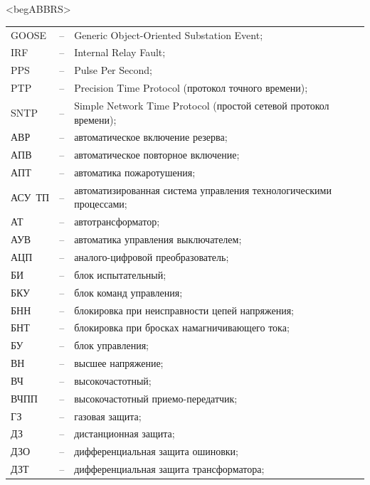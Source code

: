 \color{unimain}\section*{}
{\color{white}\fontsize{0.1pt}{0.1pt}\selectfont<begABBRS>}
\color{black}
\begin{longtable}{>{\raggedright\arraybackslash}m{2cm}>{\raggedright\arraybackslash}m{0.5cm}>{\raggedright\arraybackslash}m{20cm}}
\endfirsthead\endhead\endfoot\endlastfoot
GOOSE & -- & Generic Object-Oriented Substation Event; \\
IRF & -- & Internal Relay Fault; \\
PPS & -- & Pulse Per Second; \\
PTP & -- & Precision Time Protocol (протокол точного времени); \\
SNTP & -- & Simple Network Time Protocol (простой сетевой протокол времени); \\
АВР & -- & автоматическое включение резерва; \\
АПВ & -- & автоматическое повторное включение; \\
АПТ & -- & автоматика пожаротушения; \\
АСУ~ТП & -- & автоматизированная система управления технологическими процессами; \\
АТ & -- & автотрансформатор; \\
АУВ & -- & автоматика управления выключателем; \\
АЦП & -- & аналого-цифровой преобразователь; \\
БИ & -- & блок испытательный; \\
БКУ & -- & блок команд управления; \\
БНН & -- & блокировка при неисправности цепей напряжения; \\
БНТ & -- & блокировка при бросках намагничивающего тока; \\
БУ & -- & блок управления; \\
ВН & -- & высшее напряжение; \\
ВЧ & -- & высокочастотный; \\
ВЧПП & -- & высокочастотный приемо-передатчик; \\
ГЗ & -- & газовая защита; \\
ДЗ & -- & дистанционная защита; \\
ДЗО & -- & дифференциальная защита ошиновки; \\
ДЗТ & -- & дифференциальная защита трансформатора; \\

\end{longtable}
